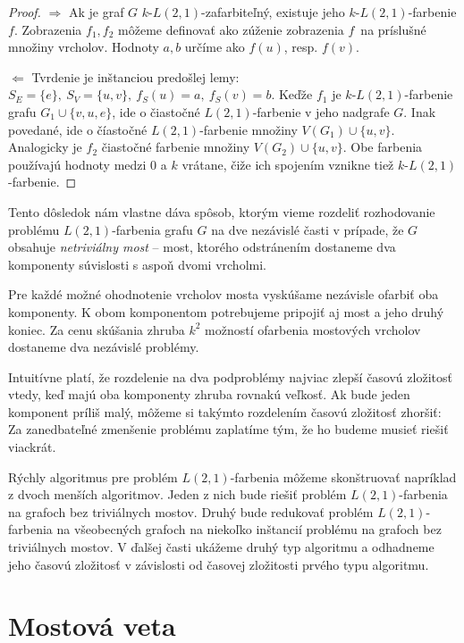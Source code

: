 \begin{proof}
    $\boxed{\Rightarrow}$
        Ak je graf $G$ $k$-$L(2,1)$-zafarbiteľný, existuje jeho $k$-$L(2,1)$-farbenie $f$. Zobrazenia $f_1, f_2$ môžeme
        definovať ako zúženie zobrazenia $f$ na príslušné množiny vrcholov. Hodnoty $a, b$ určíme ako $f(u)$, resp. $f(v)$.

    $\boxed{\Leftarrow}$
        Tvrdenie je inštanciou predošlej lemy: $S_E = \{e\},\ S_V = \{u,v\},\ f_S(u) = a,\ f_S(v) = b$. Keďže $f_1$
        je $k$-$L(2,1)$-farbenie grafu $G_1 \cup \{v, u, e\}$, ide o čiastočné $L(2,1)$-farbenie v jeho nadgrafe $G$.
        Inak povedané, ide o číastočné $L(2,1)$-farbenie množiny $V(G_1) \cup \{u, v\}$. Analogicky je $f_2$ čiastočné
        farbenie množiny $V(G_2) \cup \{u,v\}$. Obe farbenia používajú hodnoty medzi $0$ a $k$ vrátane, čiže ich
        spojením vznikne tiež $k$-$L(2,1)$-farbenie.
\end{proof}


Tento dôsledok nám vlastne dáva spôsob, ktorým vieme rozdeliť rozhodovanie
problému $L(2,1)$-farbenia grafu $G$ na dve nezávislé časti v prípade,
že $G$ obsahuje \emph{netriviálny most} -- most, ktorého odstránením dostaneme
dva komponenty súvislosti s aspoň dvomi vrcholmi.

Pre každé možné ohodnotenie vrcholov mosta vyskúšame nezávisle ofarbiť oba
komponenty. K obom komponentom potrebujeme pripojiť aj most a jeho druhý koniec. Za cenu
skúšania zhruba $k^2$ možností ofarbenia mostových vrcholov dostaneme dva nezávislé
problémy.

Intuitívne platí, že rozdelenie na dva podproblémy
najviac zlepší časovú zložitosť vtedy, keď majú oba komponenty zhruba rovnakú veľkosť.
Ak bude jeden komponent príliš malý, môžeme si takýmto rozdelením časovú zložitosť zhoršiť:
Za zanedbateľné zmenšenie problému zaplatíme tým, že ho budeme musieť riešiť viackrát.

Rýchly algoritmus pre problém $L(2,1)$-farbenia môžeme skonštruovať napríklad z dvoch menších
algoritmov. Jeden z nich bude riešiť problém $L(2,1)$-farbenia na grafoch bez triviálnych mostov.
Druhý bude redukovať problém $L(2,1)$-farbenia na všeobecných grafoch na niekoľko inštancií
problému na grafoch bez triviálnych mostov. V ďalšej časti ukážeme druhý typ algoritmu a odhadneme
jeho časovú zložitosť v závislosti od časovej zložitosti prvého typu algoritmu.

\section{Mostová veta}

